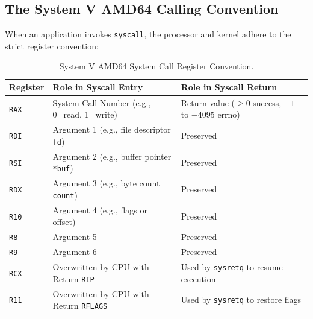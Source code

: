 \subsection{The System V AMD64 Calling Convention}
When an application invokes \texttt{syscall}, the processor and kernel adhere to the strict register convention:
\begin{table}[htbp]
\centering
\small
\begin{tabular}{lll}
\hline
\textbf{Register} & \textbf{Role in Syscall Entry} & \textbf{Role in Syscall Return} \\
\hline
\texttt{RAX} & System Call Number (e.g., 0=read, 1=write) & Return value ($\ge 0$ success, $-1$ to $-4095$ errno) \\
\texttt{RDI} & Argument 1 (e.g., file descriptor \texttt{fd}) & Preserved \\
\texttt{RSI} & Argument 2 (e.g., buffer pointer \texttt{*buf}) & Preserved \\
\texttt{RDX} & Argument 3 (e.g., byte count \texttt{count}) & Preserved \\
\texttt{R10} & Argument 4 (e.g., flags or offset) & Preserved \\
\texttt{R8} & Argument 5 & Preserved \\
\texttt{R9} & Argument 6 & Preserved \\
\texttt{RCX} & Overwritten by CPU with Return \texttt{RIP} & Used by \texttt{sysretq} to resume execution \\
\texttt{R11} & Overwritten by CPU with Return \texttt{RFLAGS} & Used by \texttt{sysretq} to restore flags \\
\hline
\end{tabular}
\caption{System V AMD64 System Call Register Convention.}
\label{tab:syscall_regs}
\end{table}

